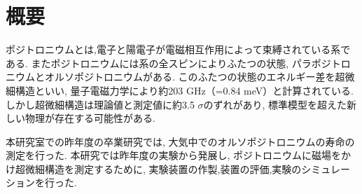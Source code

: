 \chapter{概要}\label{introduction}

ポジトロニウムとは,電子と陽電子が電磁相互作用によって束縛されている系である.
またポジトロニウムには系の全スピンによりふたつの状態,
パラポジトロニウムとオルソポジトロニウムがある.
このふたつの状態のエネルギー差を超微細構造といい,
量子電磁力学により約203 GHz（=0.84 meV）と計算されている.
しかし超微細構造は理論値と測定値に約3.5 $\sigma$のずれがあり,
標準模型を超えた新しい物理が存在する可能性がある.

本研究室での昨年度の卒業研究では,
大気中でのオルソポジトロニウムの寿命の測定を行った.
本研究では昨年度の実験から発展し,
ポジトロニウムに磁場をかけ超微細構造を測定するために,
実験装置の作製,装置の評価,実験のシミュレーションを行った.

